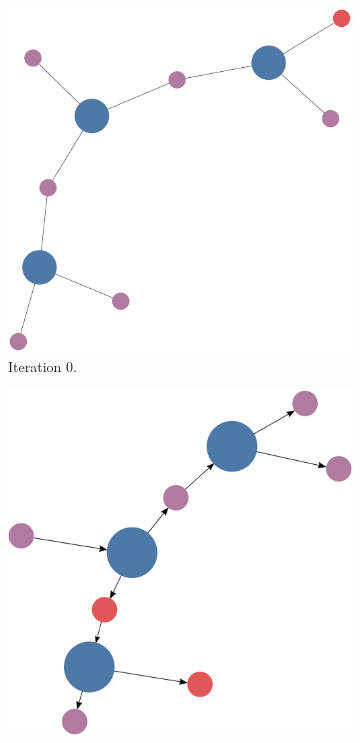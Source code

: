 \documentclass[titlepage,11pt]{article}
\begin{document}
\begin{figure}[!htb]
	\centering
	\begin{subfigure}[!htb]{0.32\textwidth}
		\centering
		\includegraphics[width=\columnwidth]{figures/knn_simple_backward_think_0.pdf}
		\caption{Iteration 0.}
	\end{subfigure}
	\begin{subfigure}[!htb]{0.32\textwidth}
		\centering
		\includegraphics[width=\columnwidth]{figures/knn_simple_backward_think_1.pdf}

\end{subfigure}
\end{figure}
\end{document}

